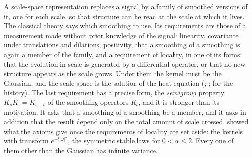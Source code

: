 A scale-space representation replaces a signal by a family of smoothed versions of it, one for
each scale, so that structure can be read at the scale at which it lives. The classical
theory says which smoothing to use. Its requirements are those of a measurement made without
prior knowledge of the signal: linearity, covariance under translations and dilations,
positivity, that a smoothing of a smoothing is again a member of the family, and a requirement
of locality, in one of its forms: that the evolution in scale is generated by a differential
operator, or that no new structure appears as the scale grows. Under them
the kernel must be the Gaussian, and the scale space is the solution of the heat equation
(; ; 
for the history). The last requirement has a precise form, the \emph{semigroup} property
$K_sK_t = K_{s+t}$ of the smoothing operators $K_t$, and it is stronger than its motivation. It asks that a smoothing of a
smoothing be a member, and it asks in addition that the result depend only on the total amount
of scale crossed.  showed what the axioms give once the
requirements of locality are set aside: the kernels with transform $e^{-t|\omega|^\alpha}$,
the symmetric stable laws for $0 < \alpha \le 2$. Every one of them other than the Gaussian has
infinite variance.


